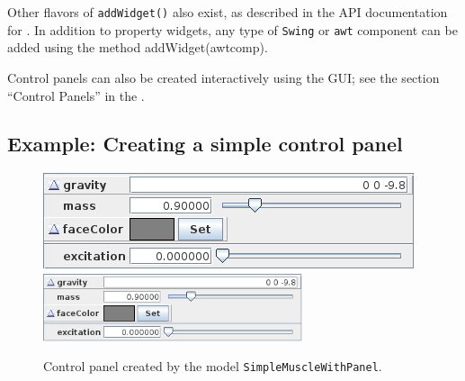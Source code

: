 Other flavors of {\tt addWidget()} also exist, as described in the API
documentation for .  In
addition to property widgets, any type of {\tt Swing} or {\tt awt}
component can be added using the method
%
{addWidget(awtcomp)}.

Control panels can also be created interactively using the GUI; see
the section ``Control Panels'' in the
.

\subsection{Example: Creating a simple control panel}

\begin{figure}[t]
\begin{center}
\iflatexml
 \includegraphics[]{images/controlPanel}
\else
 \includegraphics[width=3in]{images/controlPanel}
\fi
\end{center}
\caption{Control panel created by the model {\tt SimpleMuscleWithPanel}.}
\label{controlPanel:fig}
\end{figure}

